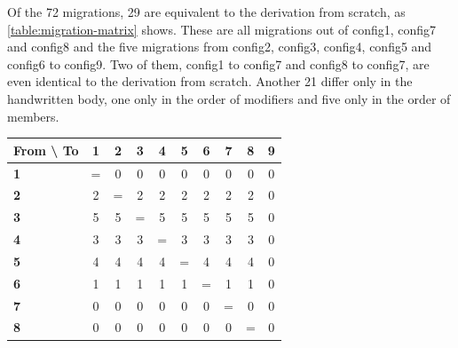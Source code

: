 Of the 72 migrations, 29 are equivalent to the derivation from scratch, as \autoref{table:migration-matrix} shows.
These are all migrations out of config1, config7 and config8 and the five migrations from config2, config3, config4, config5 and config6 to config9.
Two of them, config1 to config7 and config8 to config7, are even identical to the derivation from scratch.
Another 21 differ only in the handwritten body, one only in the order of modifiers and five only in the order of members.

\begin{table}[htbp]
    \centering
    \begin{tabular}{|l|c|c|c|c|c|c|c|c|c|}
        \hline
        \textbf{From \textbackslash{} To} & \textbf{1} & \textbf{2} & \textbf{3} & \textbf{4} & \textbf{5} & \textbf{6} & \textbf{7} & \textbf{8} & \textbf{9} \\
        \hline
        \textbf{1}                        & =          & 0          & 0          & 0          & 0          & 0          & 0          & 0          & 0          \\
        \hline
        \textbf{2}                        & 2          & =          & 2          & 2          & 2          & 2          & 2          & 2          & 0          \\
        \hline
        \textbf{3}                        & 5          & 5          & =          & 5          & 5          & 5          & 5          & 5          & 0          \\
        \hline
        \textbf{4}                        & 3          & 3          & 3          & =          & 3          & 3          & 3          & 3          & 0          \\
        \hline
        \textbf{5}                        & 4          & 4          & 4          & 4          & =          & 4          & 4          & 4          & 0          \\
        \hline
        \textbf{6}                        & 1          & 1          & 1          & 1          & 1          & =          & 1          & 1          & 0          \\
        \hline
        \textbf{7}                        & 0          & 0          & 0          & 0          & 0          & 0          & =          & 0          & 0          \\
        \hline
        \textbf{8}                        & 0          & 0          & 0          & 0          & 0          & 0          & 0          & =          & 0          \\

\end{tabular}
\end{table}
